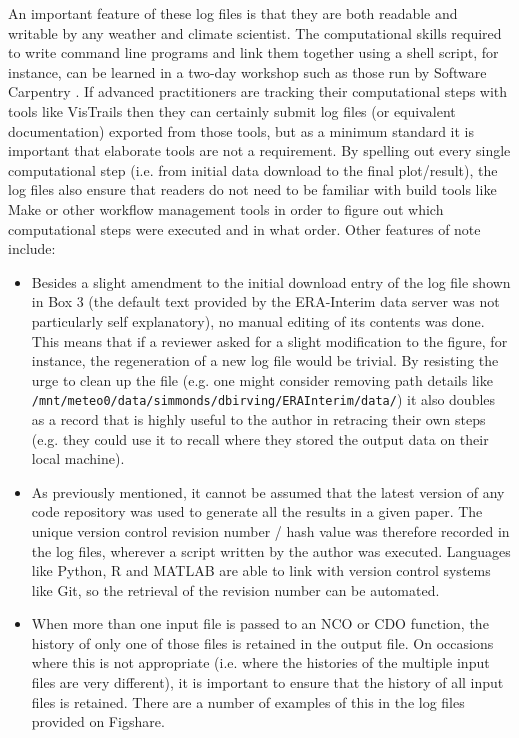 An important feature of these log files is that they are both readable and writable by any weather and climate scientist. The computational skills required to write command line programs and link them together using a shell script, for instance, can be learned in a two-day workshop such as those run by Software Carpentry \citep{Wilson2014}. If advanced practitioners are tracking their computational steps with tools like VisTrails then they can certainly submit log files (or equivalent documentation) exported from those tools, but as a minimum standard it is important that elaborate tools are not a requirement. By spelling out every single computational step (i.e. from initial data download to the final plot/result), the log files also ensure that readers do not need to be familiar with build tools like Make or other workflow management tools in order to figure out which computational steps were executed and in what order. Other features of note include:
\begin{itemize}
\item Besides a slight amendment to the initial download entry of the log file shown in Box 3 (the default text provided by the ERA-Interim data server was not particularly self explanatory), no manual editing of its contents was done. This means that if a reviewer asked for a slight modification to the figure, for instance, the regeneration of a new log file would be trivial. By resisting the urge to clean up the file (e.g. one might consider removing path details like \verb|/mnt/meteo0/data/simmonds/dbirving/ERAInterim/data/|) it also doubles as a record that is highly useful to the author in retracing their own steps (e.g. they could use it to recall where they stored the output data on their local machine).
\item As previously mentioned, it cannot be assumed that the latest version of any code repository was used to generate all the results in a given paper. The unique version control revision number / hash value was therefore recorded in the log files, wherever a script written by the author was executed. Languages like Python, R and MATLAB are able to link with version control systems like Git, so the retrieval of the revision number can be automated.
\item When more than one input file is passed to an NCO or CDO function, the history of only one of those files is retained in the output file. On occasions where this is not appropriate (i.e. where the histories of the multiple input files are very different), it is important to ensure that the history of all input files is retained. There are a number of examples of this in the log files provided on Figshare. 
\end{itemize}
  
 
  
  
  
  
  
  
  
  
  
  
  
  
  
  
  
  
  
  
  